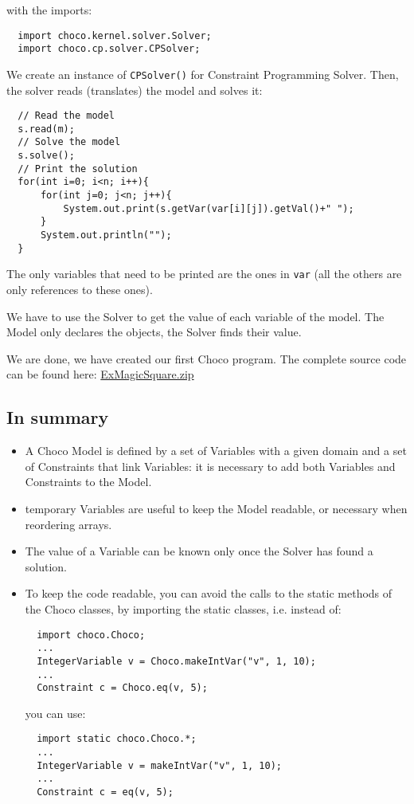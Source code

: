 with the imports:
\begin{lstlisting}
  import choco.kernel.solver.Solver;
  import choco.cp.solver.CPSolver;
\end{lstlisting}
We create an instance of \texttt{CPSolver()} for Constraint Programming Solver.
Then, the solver reads (translates) the model and solves it:
\begin{lstlisting}
  // Read the model
  s.read(m);
  // Solve the model
  s.solve();
  // Print the solution
  for(int i=0; i<n; i++){
      for(int j=0; j<n; j++){
          System.out.print(s.getVar(var[i][j]).getVal()+" ");
	  }
	  System.out.println("");
  }
\end{lstlisting}
The only variables that need to be printed are the ones in \texttt{var} (all the others are only references to these ones). 
\begin{note}
We have to use the Solver to get the value of each variable of the model. The Model only declares the objects, the Solver finds their value.
\end{note}
We are done, we have created our first Choco program. 
The complete source code can be found here: \href{media/zip/exmagicsquare.zip}{ExMagicSquare.zip}


\subsection{In summary}\label{introduction:whatisimportant}\hypertarget{introduction:whatisimportant}{}
\begin{itemize}
	\item A Choco Model is defined by a set of Variables with a given domain and a set of Constraints that link Variables:
it is necessary to add both Variables and Constraints to the Model.
	\item temporary Variables are useful to keep the Model readable, or necessary when reordering arrays.
	\item The value of a Variable can be known only once the Solver has found a solution.
	\item To keep the code readable, you can avoid the calls to the static methods of the Choco classes, by importing the static classes, i.e. instead of:
\begin{lstlisting}
  import choco.Choco;
  ...
  IntegerVariable v = Choco.makeIntVar("v", 1, 10);
  ...
  Constraint c = Choco.eq(v, 5);
\end{lstlisting}
you can use:
\begin{lstlisting}
  import static choco.Choco.*;
  ...
  IntegerVariable v = makeIntVar("v", 1, 10);
  ...
  Constraint c = eq(v, 5);
\end{lstlisting}
\end{itemize}

